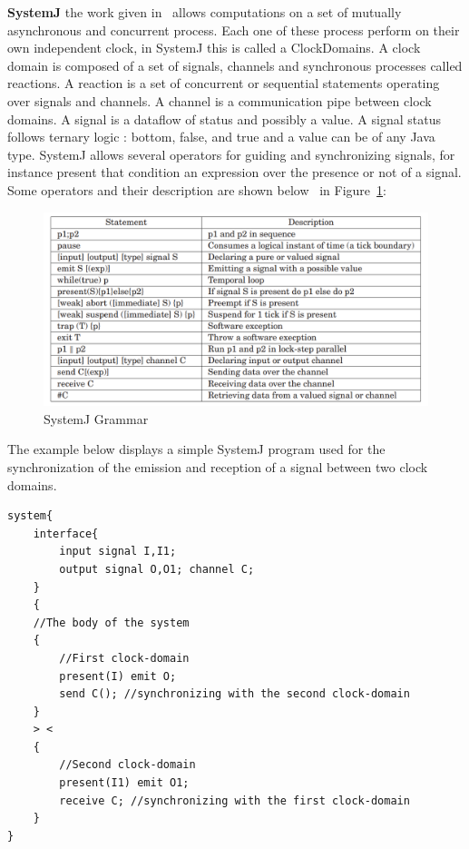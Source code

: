 \bigskip
\noindent\textbf{SystemJ} the work given in~\cite{SystemJ} allows computations on a set of mutually asynchronous and concurrent process. Each one of these process perform on their own independent clock, in SystemJ this is called a ClockDomains. A clock domain is composed of a set of signals, channels and synchronous processes called reactions. A reaction is a set of concurrent or sequential  statements operating over signals and channels. A channel is a communication pipe between clock domains. A signal is a dataflow of status and possibly a value. A signal status follows ternary logic : bottom, false, and true and a value can be of any Java  type.
SystemJ allows several operators for guiding and synchronizing signals, for instance present  that condition an expression over the presence or not of a signal. Some operators and their description are shown below~\cite{MulticoreSystemJ} in Figure~\ref{tab:systemJ}:

\begin{figure}[H]
\includegraphics[width=\textwidth]{images/SystemJOperators.png}
\caption{SystemJ Grammar}
\label{tab:systemJ}
\end{figure}

The example below displays a simple SystemJ program used for the synchronization of the emission and reception of a signal between two clock domains.

\begin{tcolorbox}[
        boxrule=0pt,
        sharp corners]
    \begin{verbatim}
system{ 
    interface{ 
        input signal I,I1;
        output signal O,O1; channel C;
    }
    { 
    //The body of the system
    { 
        //First clock-domain 
        present(I) emit O; 
        send C(); //synchronizing with the second clock-domain
    } 
    > < 
    { 
        //Second clock-domain 
        present(I1) emit O1;
        receive C; //synchronizing with the first clock-domain 
    } 
}
    \end{verbatim}
\end{tcolorbox}

